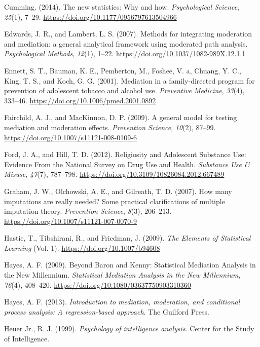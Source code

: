 \documentclass[]{DissertateUSU}
\begin{document}
\hypertarget{ref-Cumming2014}{}
Cumming. (2014). The new statistics: Why and how. \emph{Psychological
Science}, \emph{25}(1), 7--29.
\url{https://doi.org/10.1177/0956797613504966}

\hypertarget{ref-Edwards2007}{}
Edwards, J. R., and Lambert, L. S. (2007). Methods for integrating
moderation and mediation: a general analytical framework using moderated
path analysis. \emph{Psychological Methods}, \emph{12}(1), 1--22.
\url{https://doi.org/10.1037/1082-989X.12.1.1}

\hypertarget{ref-Ennett2001}{}
Ennett, S. T., Bauman, K. E., Pemberton, M., Foshee, V. a, Chuang, Y.
C., King, T. S., and Koch, G. G. (2001). Mediation in a family-directed
program for prevention of adolescent tobacco and alcohol use.
\emph{Preventive Medicine}, \emph{33}(4), 333--46.
\url{https://doi.org/10.1006/pmed.2001.0892}

\hypertarget{ref-Fairchild2009}{}
Fairchild, A. J., and MacKinnon, D. P. (2009). A general model for
testing mediation and moderation effects. \emph{Prevention Science},
\emph{10}(2), 87--99. \url{https://doi.org/10.1007/s11121-008-0109-6}

\hypertarget{ref-Ford2012}{}
Ford, J. A., and Hill, T. D. (2012). Religiosity and Adolescent
Substance Use: Evidence From the National Survey on Drug Use and Health.
\emph{Substance Use \& Misuse}, \emph{47}(7), 787--798.
\url{https://doi.org/10.3109/10826084.2012.667489}

\hypertarget{ref-Graham2007}{}
Graham, J. W., Olchowski, A. E., and Gilreath, T. D. (2007). How many
imputations are really needed? Some practical clarifications of multiple
imputation theory. \emph{Prevention Science}, \emph{8}(3), 206--213.
\url{https://doi.org/10.1007/s11121-007-0070-9}

\hypertarget{ref-Hastie2009}{}
Hastie, T., Tibshirani, R., and Friedman, J. (2009). \emph{The Elements
of Statistical Learning} (Vol. 1). \url{https://doi.org/10.1007/b94608}

\hypertarget{ref-Hayes2009}{}
Hayes, A. F. (2009). Beyond Baron and Kenny: Statistical Mediation
Analysis in the New Millennium. \emph{Statistical Mediation Analysis in
the New Millennium}, \emph{76}(4), 408--420.
\url{https://doi.org/10.1080/03637750903310360}

\hypertarget{ref-Hayes2013book}{}
Hayes, A. F. (2013). \emph{Introduction to mediation, moderation, and
conditional process analysis: A regression-based approach}. The Guilford
Press.

\hypertarget{ref-intelbook1999}{}
Heuer Jr., R. J. (1999). \emph{Psychology of intelligence analysis}.
Center for the Study of Intelligence.
\end{document}
